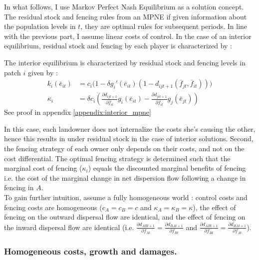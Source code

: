 In what follows, I use Markov Perfect Nash Equilibrium as a solution concept. The residual stock and fencing rules from an MPNE if given information about the population levels in $t$, they are optimal rules for subsequent periods. 
In line with the previous part, I assume linear costs of control. In the case of an interior equilibrium, residual stock and fencing by each player is characterized by : 
\begin{proposition}
The interior equilibrium is characterized by residual stock and fencing levels in patch $i$ given by : 
\begin{align}
k_i(\bar{e}_{it}) & = c_i\big( 1 - \delta g_i'(\bar{e}_{it})(1 - d_{ijt+1}(\bar{f}_{jt},\bar{f}_{it}))\big)\\
\kappa_i 	& = \delta c_i\left(\frac{\partial d_{ijt+1}}{\partial \bar{f}_{it}}g_i(\bar{e}_{it}) - \frac{\partial d_{jit+1}}{\partial \bar{f}_{it}}g_j(\bar{e}_{jt}) \right)
\end{align}
See proof in appendix \ref{appendix:interior_mpne}
\end{proposition}

In this case, each landowner does not internalize the costs she's causing the other, hence this results in under residual stock in the case of interior solutions. Second, the fencing strategy of each owner only depends on their costs, and not on the cost differential. The optimal fencing strategy is determined such that the marginal cost of fencing ($\kappa_i$) equals the discounted marginal benefits of fencing i.e. the cost of the marginal change in net dispersion flow following a change in fencing in $A$.\\
To gain further intuition, assume a fully homogeneous world : control costs and fencing costs are homogeneous ($c_A = c_B = c$ and $\kappa_A = \kappa_B = \kappa$), the effect of fencing on the outward dispersal flow are identical, and the effect of fencing on the inward dispersal flow are identical (i.e. $\frac{\partial d_{ABt+1}}{\partial f_{At}} = \frac{\partial d_{BAt+1}}{\partial f_{Bt}}$ and $\frac{\partial d_{ABt+1}}{\partial f_{Bt}} =\frac{\partial d_{BAt+1}}{\partial f_{At}}$).

\subsubsection{Homogeneous costs, growth and damages.}


